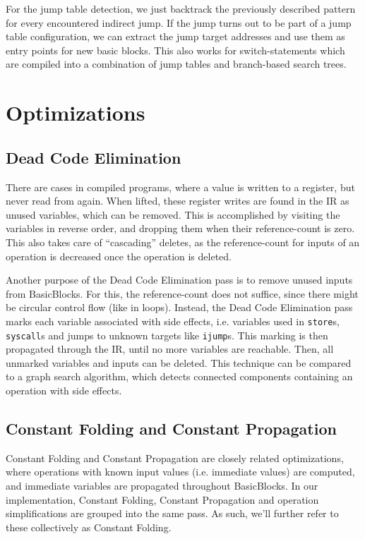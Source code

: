 \documentclass[course=eragp]{aspdoc}
\begin{document}
\par

For the jump table detection, we just backtrack the previously described pattern for every
encountered indirect jump. If the jump turns out to be part of a jump table configuration, we can
extract the jump target addresses and use them as entry points for new basic blocks. This also works
for switch-statements which are compiled into a combination of jump tables and branch-based search
trees.

\section{Optimizations}
\subsection{Dead Code Elimination}\label{dead_code_elimination}

There are cases in compiled programs, where a value is written to a register, but never read from again.
When lifted, these register writes are found in the IR as unused variables, which can be removed.
This is accomplished by visiting the variables in reverse order, and dropping them when their reference-count is zero.
This also takes care of ``cascading'' deletes, as the reference-count for inputs of an operation is decreased once the
operation is deleted.

Another purpose of the Dead Code Elimination pass is to remove unused inputs from BasicBlocks. For this, the
reference-count does not suffice, since there might be circular control flow (like in loops). Instead, the Dead Code
Elimination pass marks each variable associated with side effects, i.e. variables used in \texttt{store}s,
\texttt{syscall}s and jumps to unknown targets like \texttt{ijump}s. This marking is then propagated through the IR,
until no more variables are reachable. Then, all unmarked variables and inputs can be deleted. This
technique can be compared to a graph search algorithm, which detects connected components containing an operation with
side effects.

\subsection{Constant Folding and Constant Propagation}\label{constant_folding}

Constant Folding and Constant Propagation are closely related optimizations, where operations with known input values
(i.e. immediate values) are computed, and immediate variables are propagated throughout BasicBlocks.
In our implementation, Constant Folding, Constant Propagation and operation simplifications are grouped into the same
pass.  As such, we'll further refer to these collectively as Constant Folding.
\end{document}
